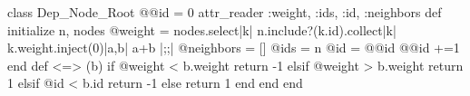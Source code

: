 \begin{rubyblock}
class Dep_Node_Root
  @@id = 0
  attr_reader :weight, :ids, :id, :neighbors
  def initialize n, nodes
    @weight = nodes.select{|k| n.include?(k.id)}.collect{|k| k.weight}.inject(0){|a,b| a+b} |;\label{code:dep-node-weight};|
    @neighbors = []
    @ids = n
    @id = @@id
    @@id +=1
  end
  def <=> (b)
    if @weight < b.weight
      return -1
    elsif @weight > b.weight
      return 1
    elsif @id < b.id
      return -1
    else
      return 1
    end
  end
end
\end{rubyblock}
